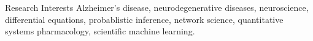 \begin{rSection}{Research Interests}
Alzheimer's disease, neurodegenerative diseases, neuroscience, differential
equations, probablistic inference, network science, quantitative systems pharmacology, scientific machine learning.
\end{rSection}